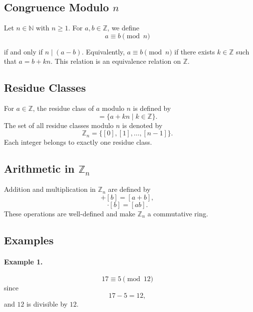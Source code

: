 \documentclass[a4paper,12pt]{article}
\theoremstyle{definition}
\begin{document}
\subsection{Congruence Modulo $n$}

Let $n \in \mathbb{N}$ with $n \geq 1$. For $a,b \in \mathbb{Z}$, we define
\begin{equation*}
a \equiv b \pmod{n}
\end{equation*}

if and only if $n \mid (a-b).$ Equivalently, $a \equiv b \pmod{n}$ if there exists $k \in \mathbb{Z}$ such that $a = b + kn.$ This relation is an equivalence relation on $\mathbb{Z}$.

\subsection{Residue Classes}

For $a \in \mathbb{Z}$, the residue class of $a$ modulo $n$ is defined by
\begin{equation*}
[a] = \{ a + kn \mid k \in \mathbb{Z} \}.
\end{equation*}
The set of all residue classes modulo $n$ is denoted by
\begin{equation*}
\mathbb{Z}_n = \{ [0], [1], \dots, [n-1] \}.
\end{equation*}
Each integer belongs to exactly one residue class.

\subsection{Arithmetic in \texorpdfstring{$\mathbb{Z}_n$}{Z_n}}

Addition and multiplication in $\mathbb{Z}_n$ are defined by
\begin{equation*}
[a] + [b] = [a+b],
\end{equation*}
\begin{equation*}
[a]\cdot[b] = [ab].
\end{equation*}
These operations are well-defined and make $\mathbb{Z}_n$ a commutative ring.

\subsection{Examples}

\paragraph{Example 1.} 
\begin{equation*}
17 \equiv 5 \pmod{12}
\end{equation*}
since
\begin{equation*}
17 - 5 = 12,
\end{equation*}
and $12$ is divisible by $12$.
\end{document}
